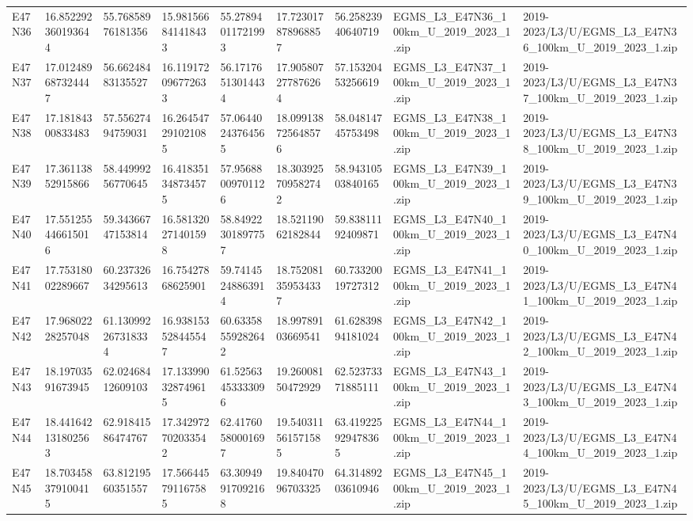 \begin{landscape}
\begin{longtable}{lllllllll}
E47N36 & 16.852292360193644 & 55.76858976181356 & 15.981566841418433 & 55.27894011721993 & 17.723017878968857 & 56.25823940640719 & EGMS\_L3\_E47N36\_100km\_U\_2019\_2023\_1.zip & 2019-2023/L3/U/EGMS\_L3\_E47N36\_100km\_U\_2019\_2023\_1.zip \\
E47N37 & 17.012489687324447 & 56.66248483135527 & 16.119172096772633 & 56.17176513014434 & 17.905807277876264 & 57.15320453256619 & EGMS\_L3\_E47N37\_100km\_U\_2019\_2023\_1.zip & 2019-2023/L3/U/EGMS\_L3\_E47N37\_100km\_U\_2019\_2023\_1.zip \\
E47N38 & 17.18184300833483 & 57.55627494759031 & 16.264547291021085 & 57.06440243764565 & 18.099138725648576 & 58.04814745753498 & EGMS\_L3\_E47N38\_100km\_U\_2019\_2023\_1.zip & 2019-2023/L3/U/EGMS\_L3\_E47N38\_100km\_U\_2019\_2023\_1.zip \\
E47N39 & 17.36113852915866 & 58.44999256770645 & 16.418351348734575 & 57.95688009701126 & 18.303925709582742 & 58.94310503840165 & EGMS\_L3\_E47N39\_100km\_U\_2019\_2023\_1.zip & 2019-2023/L3/U/EGMS\_L3\_E47N39\_100km\_U\_2019\_2023\_1.zip \\
E47N40 & 17.551255446615016 & 59.34366747153814 & 16.581320271401598 & 58.84922301897757 & 18.52119062182844 & 59.83811192409871 & EGMS\_L3\_E47N40\_100km\_U\_2019\_2023\_1.zip & 2019-2023/L3/U/EGMS\_L3\_E47N40\_100km\_U\_2019\_2023\_1.zip \\
E47N41 & 17.75318002289667 & 60.23732634295613 & 16.75427868625901 & 59.74145248863914 & 18.752081359534337 & 60.73320019727312 & EGMS\_L3\_E47N41\_100km\_U\_2019\_2023\_1.zip & 2019-2023/L3/U/EGMS\_L3\_E47N41\_100km\_U\_2019\_2023\_1.zip \\
E47N42 & 17.96802228257048 & 61.130992267318334 & 16.938153528445547 & 60.63358559282642 & 18.99789103669541 & 61.62839894181024 & EGMS\_L3\_E47N42\_100km\_U\_2019\_2023\_1.zip & 2019-2023/L3/U/EGMS\_L3\_E47N42\_100km\_U\_2019\_2023\_1.zip \\
E47N43 & 18.19703591673945 & 62.02468412609103 & 17.133990328749615 & 61.52563453333096 & 19.26008150472929 & 62.52373371885111 & EGMS\_L3\_E47N43\_100km\_U\_2019\_2023\_1.zip & 2019-2023/L3/U/EGMS\_L3\_E47N43\_100km\_U\_2019\_2023\_1.zip \\
E47N44 & 18.441642131802563 & 62.91841586474767 & 17.342972702033542 & 62.41760580001697 & 19.540311561571585 & 63.419225929478365 & EGMS\_L3\_E47N44\_100km\_U\_2019\_2023\_1.zip & 2019-2023/L3/U/EGMS\_L3\_E47N44\_100km\_U\_2019\_2023\_1.zip \\
E47N45 & 18.703458379100415 & 63.81219560351557 & 17.566445791167585 & 63.30949917092168 & 19.84047096703325 & 64.31489203610946 & EGMS\_L3\_E47N45\_100km\_U\_2019\_2023\_1.zip & 2019-2023/L3/U/EGMS\_L3\_E47N45\_100km\_U\_2019\_2023\_1.zip \\

\end{longtable}
\end{landscape}
